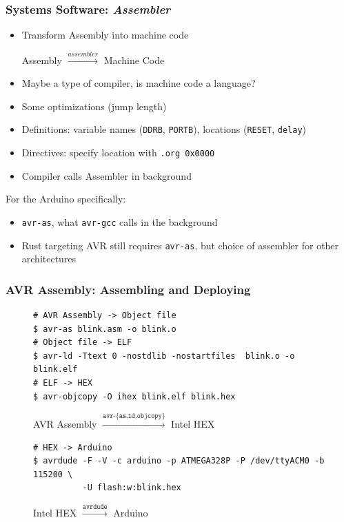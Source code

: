 \documentclass{beamer} \usetheme{Madrid}
\begin{document}
\begin{frame}
    \frametitle{Systems Software: \emph{Assembler}}
    \vfill
    \begin{itemize}
        \item Transform Assembly into machine code
            \begin{center}
                Assembly $\xrightarrow{assembler}$ Machine Code
            \end{center}
        \item Maybe a type of compiler, is machine code a language?
        \item Some optimizations (jump length)
        \item Definitions: variable names (\texttt{DDRB}, \texttt{PORTB}), locations (\texttt{RESET}, \texttt{delay})
        \item Directives: specify location with \texttt{.org 0x0000}
        \item Compiler calls Assembler in background
    \end{itemize}
    \vfill
    For the Arduino specifically:
    \begin{itemize}
        \item \texttt{avr-as}, what \texttt{avr-gcc} calls in the background
        \item Rust targeting AVR still requires \texttt{avr-as}, but choice of assembler for other architectures
    \end{itemize}
    \vfill
\end{frame}

\begin{frame}[fragile]
    \frametitle{AVR Assembly: Assembling and Deploying}
    \begin{figure}
        \begin{verbatim}
# AVR Assembly -> Object file
$ avr-as blink.asm -o blink.o
# Object file -> ELF
$ avr-ld -Ttext 0 -nostdlib -nostartfiles  blink.o -o blink.elf
# ELF -> HEX
$ avr-objcopy -O ihex blink.elf blink.hex
        \end{verbatim}
        \caption{AVR Assembly $\xrightarrow{\texttt{avr-\{as,ld,objcopy\}}}$ Intel HEX}
    \end{figure}
    \begin{figure}
        \begin{verbatim}
# HEX -> Arduino
$ avrdude -F -V -c arduino -p ATMEGA328P -P /dev/ttyACM0 -b 115200 \
          -U flash:w:blink.hex
        \end{verbatim}
        \caption{Intel HEX $\xrightarrow{\texttt{avrdude}}$ Arduino}
    \end{figure}
\end{frame}
\end{document}
